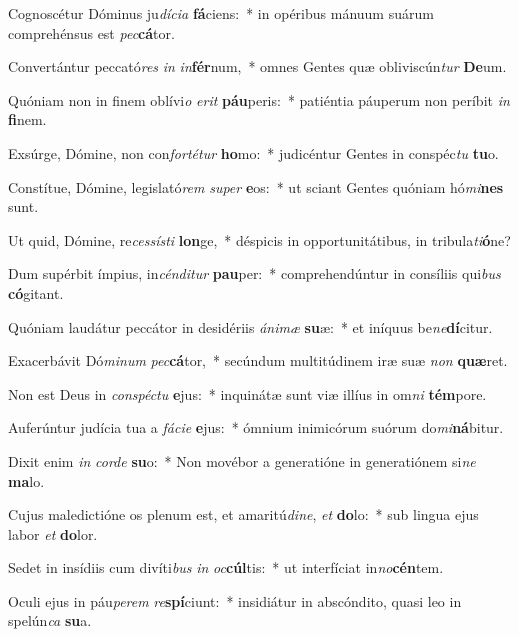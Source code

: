 \item Cognoscétur Dóminus ju\textit{dí}\textit{ci}\textit{a} \textbf{fá}ciens:~* in opéribus mánuum suárum comprehénsus est \textit{pec}\textbf{cá}tor.
\item Convertántur peccató\textit{res} \textit{in} \textit{in}\textbf{fér}num,~* omnes Gentes quæ obliviscún\textit{tur} \textbf{De}um.
\item Quóniam non in finem oblívi\textit{o} \textit{e}\textit{rit} \textbf{páu}peris:~* patiéntia páuperum non períbit \textit{in} \textbf{fi}nem.
\item Exsúrge, Dómine, non con\textit{for}\textit{té}\textit{tur} \textbf{ho}mo:~* judicéntur Gentes in conspéc\textit{tu} \textbf{tu}o.
\item Constítue, Dómine, legislató\textit{rem} \textit{su}\textit{per} \textbf{e}os:~* ut sciant Gentes quóniam hó\textit{mi}\textbf{nes} sunt.
\item Ut quid, Dómine, re\textit{ces}\textit{sís}\textit{ti} \textbf{lon}ge,~* déspicis in opportunitátibus, in tribula\textit{ti}\textbf{ó}ne?
\item Dum supérbit ímpius, in\textit{cén}\textit{di}\textit{tur} \textbf{pau}per:~* comprehendúntur in consíliis qui\textit{bus} \textbf{có}gitant.
\item Quóniam laudátur peccátor in desidériis \textit{á}\textit{ni}\textit{mæ} \textbf{su}æ:~* et iníquus be\textit{ne}\textbf{dí}citur.
\item Exacerbávit Dó\textit{mi}\textit{num} \textit{pec}\textbf{cá}tor,~* secúndum multitúdinem iræ suæ \textit{non} \textbf{quæ}ret.
\item Non est Deus in \textit{con}\textit{spéc}\textit{tu} \textbf{e}jus:~* inquinátæ sunt viæ illíus in om\textit{ni} \textbf{tém}pore.
\item Auferúntur judícia tua a \textit{fá}\textit{ci}\textit{e} \textbf{e}jus:~* ómnium inimicórum suórum do\textit{mi}\textbf{ná}bitur.
\item Dixit enim \textit{in} \textit{cor}\textit{de} \textbf{su}o:~* Non movébor a generatióne in generatiónem si\textit{ne} \textbf{ma}lo.
\item Cujus maledictióne os plenum est, et amaritú\textit{di}\textit{ne}, \textit{et} \textbf{do}lo:~* sub lingua ejus labor \textit{et} \textbf{do}lor.
\item Sedet in insídiis cum divíti\textit{bus} \textit{in} \textit{oc}\textbf{cúl}tis:~* ut interfíciat in\textit{no}\textbf{cén}tem.
\item Oculi ejus in páu\textit{pe}\textit{rem} \textit{re}\textbf{spí}ciunt:~* insidiátur in abscóndito, quasi leo in spelún\textit{ca} \textbf{su}a.
